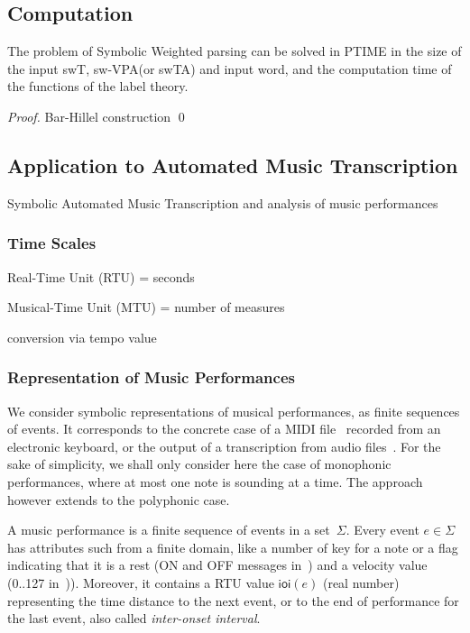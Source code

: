 \documentclass[runningheads]{llncs}
\def\SWT{\textsf{swT}\xspace}
\def\SWTA{\textsf{swTA}\xspace}
\def\SWVPA{\textsf{sw-VPA}\xspace}
\newcommand{\ioi}[1]{\mathsf{ioi}({#1})}
\begin{document}
\subsection{Computation}

\begin{proposition}
The problem of Symbolic Weighted  parsing 
can be solved in PTIME in the size of the input \SWT, \SWVPA (or \SWTA) and input word, 
and the computation time of the functions of the label theory.
\end{proposition}
%
\begin{proof}
Bar-Hillel construction
\qed  
\end{proof}










\subsection{Application to Automated Music Transcription}
\label{sec:transcription}
Symbolic Automated Music Transcription
and analysis of music performances

\subsubsection{Time Scales}
Real-Time Unit (RTU) = seconds

\noindent 
Musical-Time Unit (MTU) = number of measures

\noindent 
conversion via tempo value

\subsubsection{Representation of Music Performances}
We consider symbolic representations of musical performances, as finite sequences of events.
It corresponds to the concrete case of a MIDI file~\cite{SMF} 
recorded  from an electronic keyboard, 
or the output of a transcription from audio files~\cite{Benetos18AMTsurvey}.
%
For the sake of simplicity, 
we shall only consider here the case of monophonic performances, 
where at most one note is sounding at a time. 
The approach however extends to the polyphonic case.

A music performance is a finite sequence of events in a set~$\Sigma$.
Every event $e \in \Sigma$ has attributes such from a finite domain, 
like a number of key for a note 
or a flag indicating that it is a rest 
(\textsf{ON} and \textsf{OFF} messages in~\cite{SMF})
and a velocity value (0..127 in~\cite{SMF})).
Moreover, it contains a RTU value $\ioi{e}$ (real number) 
representing the time distance to the next event, 
or to the end of performance for the last event,
also called \emph{inter-onset interval}.
\end{document}

